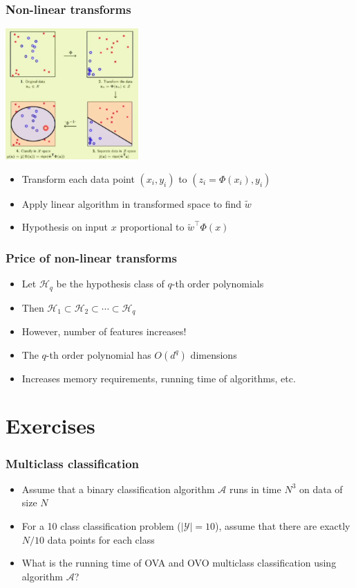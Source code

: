 \documentclass[10pt]{beamer}
\begin{document}
\begin{frame}
  \frametitle{Non-linear transforms}
  \begin{center}
  \includegraphics[height=5cm]{images/nonlin.png}
  \end{center}
  \begin{itemize}
	\item Transform each data point $(x_i,y_i)$ to $(z_i=\Phi(x_i),y_i)$
	\item Apply linear algorithm in transformed space to find $\tilde{w}$
	\item Hypothesis on input $x$ proportional to $\tilde{w}^\top \Phi(x)$
  \end{itemize}
\end{frame}

\begin{frame}
  \frametitle{Price of non-linear transforms}
  \begin{itemize}
	\item Let $\mathcal{H}_q$ be the hypothesis class of $q$-th order polynomials
	\item Then $\mathcal{H}_1 \subset \mathcal{H}_2 \subset \cdots \subset \mathcal{H}_q$
	\item However, number of features increases!
	\item The $q$-th order polynomial has $O(d^q)$ dimensions
	\item Increases memory requirements, running time of algorithms, etc.
  \end{itemize}
\end{frame}

\section{Exercises}

\begin{frame}
  \frametitle{Multiclass classification}
  \begin{itemize}
  \item Assume that a binary classification algorithm $\mathcal{A}$ runs in time $N^3$ on data of size $N$
  \item For a 10 class classification problem ($|\mathcal{Y}|=10$), assume that there are exactly $N/10$ data points for each class
  \item What is the running time of OVA and OVO multiclass classification using algorithm $\mathcal{A}$?
  \end{itemize}
\end{frame}
\end{document}
